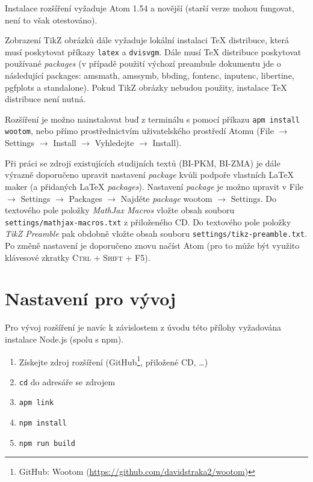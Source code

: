 Instalace rozšíření vyžaduje Atom 1.54 a novější (starší verze mohou fungovat, není to však otestováno).

Zobrazení TikZ obrázků dále vyžaduje lokální instalaci \TeX{} distribuce, která musí poskytovat příkazy
\texttt{latex} a \texttt{dvisvgm}. Dále musí \TeX{} distribuce poskytovat používané \textit
{packages} (v případě použití výchozí preambule dokumentu jde o následující packages: amsmath, amssymb, bbding, fontenc,
inputenc, libertine, pgfplots a standalone). Pokud TikZ obrázky nebudou použity, instalace \TeX{} distribuce není nutná.

\begin{sloppypar}
Rozšíření je možno nainstalovat buď z terminálu s pomocí příkazu \texttt{apm install wootom}, nebo přímo
prostřednictvím uživatelského prostředí Atomu (File $\to$ Settings $\to$ Install $\to$ Vyhledejte  $\to$
Install).
\end{sloppypar}

\begin{sloppypar}
Při práci se zdroji existujících studijních textů (BI-PKM, BI-ZMA) je dále výrazně doporučeno upravit nastavení
\textit{package} kvůli podpoře vlastních \LaTeX{} maker (a přidaných \LaTeX{} \textit{packages}). Nastavení
\textit{package} je možno upravit v File $\to$ Settings $\to$ Packages $\to$ Najděte \textit{package} wootom
$\to$ Settings. Do textového pole položky \textit{MathJax Macros} vložte obsah souboru \texttt
{settings/mathjax-macros.txt} z přiloženého CD. Do textového pole položky \textit{TikZ Preamble} pak obdobně vložte
obsah souboru \texttt{settings/tikz-preamble.txt}. Po změně nastavení je doporučeno znovu načíst Atom (pro to
může být využito klávesové zkratky \textsc{Ctrl + Shift + F5}).
\end{sloppypar}

\section*{Nastavení pro vývoj}

Pro vývoj rozšíření je navíc k závislostem z úvodu této přílohy vyžadována instalace Node.js (spolu s npm).

\begin{enumerate}[label=\textbf{\arabic*.}, ref=F\arabic*.]
    \item Získejte zdroj rozšíření (GitHub\footnote{GitHub: Wootom (\url{https://github.com/davidstraka2/wootom})},
        přiložené CD, \ldots)
    \item \texttt{cd} do adresáře se zdrojem
    \item \texttt{apm link}
    \item \texttt{npm install}
    \item \texttt{npm run build}
\end{enumerate}

